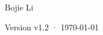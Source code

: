 \begin{titlepage}
\vfill
{\LARGE\sffamily Bojie Li\par}
\vspace{0.3cm}
\begingroup{}\endgroup
\vspace{0.7cm}
{\small\sffamily\color{structurecolor!80} Version v1.2 · \today\par}
\vspace{1.2cm}
\end{titlepage}

